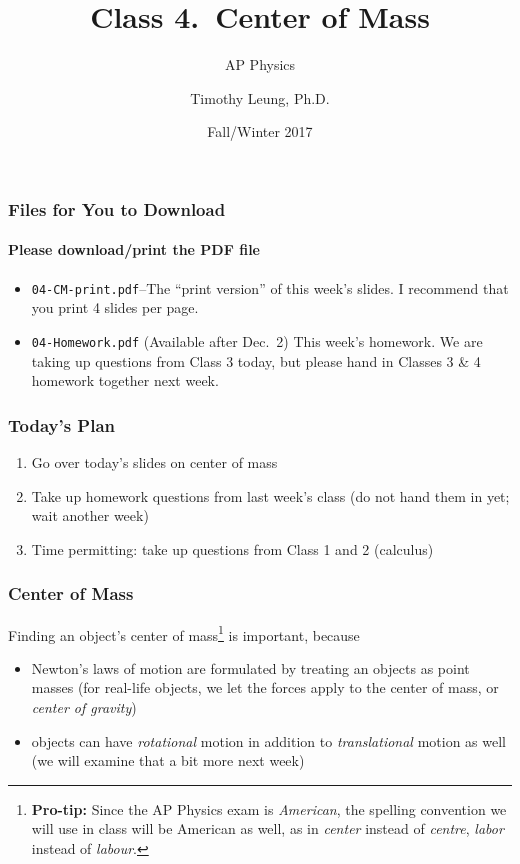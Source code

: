 \documentclass[12pt,compress,aspectratio=169]{beamer}
\title{Class 4.\ Center of Mass}
\subtitle{AP Physics}
\author[TML]{Timothy Leung, Ph.D.}
\institute{Olympiads School}
\date{Fall/Winter 2017}
\begin{document}
\begin{frame}
  \maketitle
\end{frame}

\begin{frame}
  \frametitle{Files for You to Download}
  \framesubtitle{Please download/print the PDF file}
  \begin{itemize}
  \item\texttt{04-CM-print.pdf}--The ``print version'' of this week's slides.
    I recommend that you print 4 slides per page.
  \item\texttt{04-Homework.pdf} (Available after Dec.\ 2) This week's homework.
    We are taking up questions from Class 3 today, but please hand in Classes 3
    \& 4 homework together next week.
  \end{itemize}
\end{frame}

\begin{frame}
  \frametitle{Today's Plan}
  \begin{enumerate}
  \item Go over today's slides on center of mass
  \item Take up homework questions from last week's class (do not hand them in
    yet; wait another week)
  \item Time permitting: take up questions from Class 1 and 2 (calculus)
  \end{enumerate}
\end{frame}


\begin{frame}
  \frametitle{Center of Mass}
  Finding an object's center of mass\footnote{\textbf{Pro-tip:} Since the AP
    Physics exam is \emph{American}, the spelling convention we will use in
    class will be American as well, as in \emph{center} instead of
    \emph{centre}, \emph{labor} instead of \emph{labour}.}
  is important, because
  \begin{itemize}
  \item Newton's laws of motion are formulated by treating an objects as point
    masses (for real-life objects, we let the forces apply to the center of
    mass, or \emph{center of gravity})
  \item objects can have \emph{rotational} motion in addition to
    \emph{translational} motion as well (we will examine that a bit more
    next week)
  \end{itemize}
\end{frame}
\end{document}
